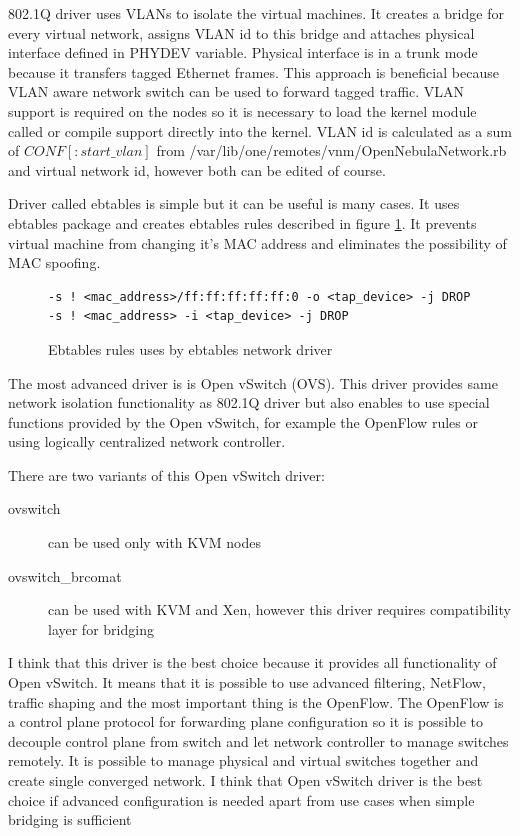802.1Q driver uses \Ac{VLAN}s to isolate the virtual machines. It creates a bridge for every virtual network, assigns \Ac{VLAN} id to this bridge and attaches physical interface defined in PHYDEV variable. Physical interface is in a trunk mode because it transfers tagged Ethernet frames. This approach is beneficial because \Ac{VLAN} aware network switch can be used to forward tagged traffic. \Ac{VLAN} support is required on the nodes so it is necessary to load the kernel module called  or compile support directly into the kernel. \Ac{VLAN} id is calculated as a sum of $CONF[:start\_vlan]$ from /var/lib/one/remotes/vnm/OpenNebulaNetwork.rb and virtual network id, however both can be edited of course.

Driver called ebtables is simple but it can be useful is many cases. It uses ebtables package and creates ebtables rules described in figure \ref{code:ebtables}. It prevents virtual machine from changing it's \Ac{MAC} address and eliminates the possibility of \Ac{MAC} spoofing.

\begin{figure}[htb]
\caption{Ebtables rules uses by ebtables network driver}
\label{code:ebtables}
\begin{verbatim}
-s ! <mac_address>/ff:ff:ff:ff:ff:0 -o <tap_device> -j DROP
-s ! <mac_address> -i <tap_device> -j DROP
\end{verbatim}
\end{figure}

The most advanced driver is is Open vSwitch (\Ac{OVS}). This driver provides same network isolation functionality as 802.1Q driver but also enables to use special functions provided by the Open vSwitch, for example the OpenFlow rules or using logically centralized network controller.

There are two variants of this Open vSwitch driver:
\begin{description}
	\item[ovswitch] can be used only with \Ac{KVM} nodes
	\item[ovswitch\_brcomat] can be used with \Ac{KVM} and Xen, however this driver requires compatibility layer for bridging
\end{description}

I think that this driver is the best choice because it provides all functionality of Open vSwitch. It means that it is possible to use advanced filtering, NetFlow, traffic shaping and the most important thing is the OpenFlow. The OpenFlow is a control plane protocol for forwarding plane configuration so it is possible to decouple control plane from switch and let network controller to manage switches remotely. It is possible to manage physical and virtual switches together and create single converged network. I think that Open vSwitch driver is the best choice if advanced configuration is needed apart from use cases when simple bridging is sufficient

